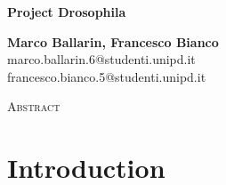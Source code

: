 \documentclass{article}
\begin{document}
\begin{center}
    \huge
    \textbf{Project Drosophila}  %
    
    \normalsize
    \vspace{0.4cm}
    \textbf{Marco Ballarin, Francesco Bianco}   \\ %
    marco.ballarin.6@studenti.unipd.it \\
    francesco.bianco.5@studenti.unipd.it

    \vspace{0.5cm}
    \Large
    \textsc{ Abstract}
    \begin{adjustwidth}{30pt}{30pt}
    \normalsize
    \vspace{0.3cm}
    
    \end{adjustwidth}
\end{center}
\newpage
\tableofcontents
\newpage

\section{Introduction \label{sec:intro}}

\newpage


\newpage


\newpage
\end{document}
